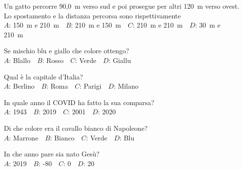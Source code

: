 \mcquestionfooter



\def\mcquestionnumber{11}


\mcquestionheader Un gatto percorre 90,0~m verso sud e poi prosegue per altri 120~m verso ovest. Lo spostamento e la distanza percorsa sono rispettivamente\\
{$A$}: 150~m e 210~m\ \ {$B$}: 210~m e 150~m\ \ {$C$}: 210~m e 210~m\ \ {$D$}: 30~m e 210~m\ \ 

\mcquestionfooter



\def\mcquestionnumber{12}


\mcquestionheader Se mischio blu e giallo che colore ottengo?\\
{$A$}: Blallo\ \ {$B$}: Rosso\ \ {$C$}: Verde\ \ {$D$}: Giallu\ \ 

\mcquestionfooter



\mcpaperfooter

\def\mcserialnumber{31}
\mcpaperheader


\def\mcquestionnumber{1}


\mcquestionheader Qual è la capitale d’Italia?\\
{$A$}: Berlino\ \ {$B$}: Roma\ \ {$C$}: Parigi\ \ {$D$}: Milano\ \ 

\mcquestionfooter



\def\mcquestionnumber{2}


\mcquestionheader In quale anno il COVID ha fatto la sua comparsa?\\
{$A$}: 1943\ \ {$B$}: 2019\ \ {$C$}: 2001\ \ {$D$}: 2020\ \ 

\mcquestionfooter



\def\mcquestionnumber{3}


\mcquestionheader Di che colore era il cavallo bianco di Napoleone?\\
{$A$}: Marrone\ \ {$B$}: Bianco\ \ {$C$}: Verde\ \ {$D$}: Blu\ \ 

\mcquestionfooter



\def\mcquestionnumber{4}


\mcquestionheader In che anno pare sia nato Gesù?\\
{$A$}: 2019\ \ {$B$}: -80\ \ {$C$}: 0\ \ {$D$}: 20\ \ 

\mcquestionfooter



